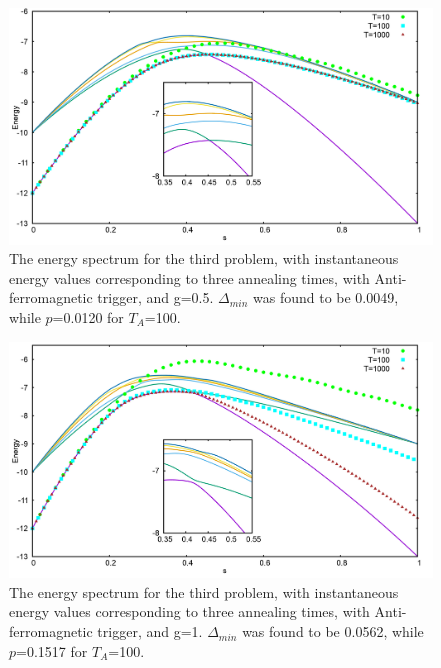 \documentclass[../main.tex]{subfiles}
\begin{document}
\begin{figure}[H]
\centering 
\includegraphics[scale=0.3]{528_s12_A_g0.png}
\caption{The energy spectrum for the third problem, with instantaneous energy values corresponding to three annealing times, with Anti-ferromagnetic trigger, and g=0.5. $\Delta_{min}$ was found to be 0.0049, while $p$=0.0120 for $T_A$=100. }
\label{fig:a7}
\end{figure}
\begin{figure}[H]
\centering 
\includegraphics[scale=0.3]{528_s12_A_g1.png}
\caption{The energy spectrum for the third problem, with instantaneous energy values corresponding to three annealing times, with Anti-ferromagnetic trigger, and g=1. $\Delta_{min}$ was found to be 0.0562, while $p$=0.1517 for $T_A$=100. }
\label{fig:a8}
\end{figure}
\end{document}
